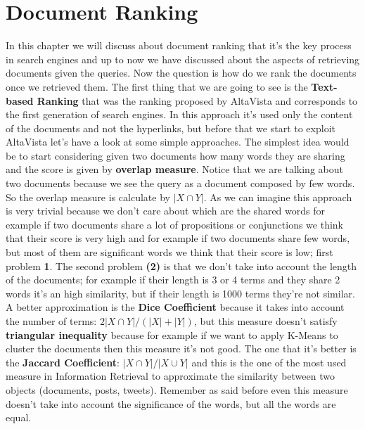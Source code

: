 \chapter{Document Ranking}
In this chapter we will discuss about document ranking that it's the key process in search engines and up to now we have discussed about the aspects of retrieving documents given the queries. Now the question is how do we rank the documents once we retrieved them.\newline
The first thing that we are going to see is the \textbf{Text-based Ranking} that was the ranking proposed by AltaVista and corresponds to the first generation of search engines. In this approach it's used only the content of the documents and not the hyperlinks, but before that we start to exploit AltaVista let's have a look at some simple approaches.\newline
The simplest idea would be to start considering given two documents how many words they are sharing and the score is given by \textbf{overlap measure}. Notice that we are talking about two documents because we see the query as a document composed by few words. So the overlap measure is calculate by $|X \cap Y|$.\newline
As we can imagine this approach is very trivial because we don't care about which are the shared words for example if two documents share a lot of propositions or conjunctions we think that their score is very high and for example if two documents share few words, but most of them are significant words we think that their score is low; first problem \textbf{1}.\newline
The second problem \textbf{(2)} is that we don't take into account the length of the documents; for example if their length is 3 or 4 terms and they share 2 words it's an high similarity, but if their length is 1000 terms they're not similar.\newline
A better approximation is the \textbf{Dice Coefficient} because it takes into account the number of terms: $2|X \cap Y|/(|X|+|Y|)$, but this measure doesn't satisfy \textbf{triangular inequality} because for example if we want to apply K-Means to cluster the documents then this measure it's not good.\newline
The one that it's better is the \textbf{Jaccard Coefficient}: $|X \cap Y|/|X \cup Y|$ and this is the one of the most used measure in Information Retrieval to approximate the similarity between two objects (documents, posts, tweets). Remember as said before even this measure doesn't take into account the significance of the words, but all the words are equal.\newline
